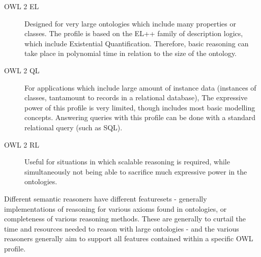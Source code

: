 \documentclass{article}
\begin{document}
\begin{description}
    \item[OWL 2 EL] Designed for very large ontologies which include many
    properties or classes. The profile is based on the EL++ family of 
    description logics, which include Existential Quantification. Therefore,
    basic reasoning can take place in polynomial time in relation to the size of
    the ontology.
    \item[OWL 2 QL] For applications which include large amount of instance data
    (instances of classes, tantamount to records in a relational database), The
    expressive power of this profile is very limited, though includes most basic
    modelling concepts. Answering queries with this profile can be done with a
    standard relational query (such as SQL).
    \item[OWL 2 RL] Useful for situations in which scalable reasoning is
    required, while simultaneously not being able to sacrifice much expressive
    power in the ontologies.
\end{description}

Different semantic reasoners have different featuresets - generally
implementations of reasoning for various axioms found in ontologies, or
completeness of various reasoning methods. These are generally to curtail 
the time and resources needed to reason with large ontologies - and the various
reasoners generally aim to support all features contained within a specific OWL
profile\cite{reasonercompare}\cite{reasonerbenchmark}.
\end{document}
